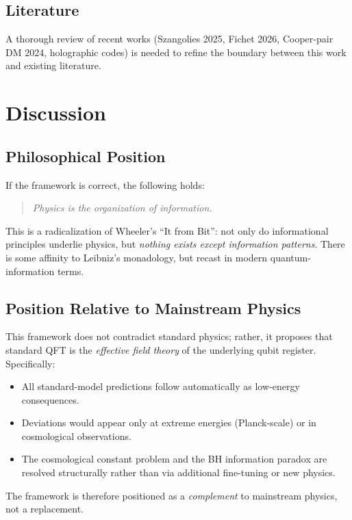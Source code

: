 \documentclass[11pt,a4paper]{article}
\begin{document}
\subsection{Literature}

A thorough review of recent works (Szangolies 2025, Fichet 2026, Cooper-pair DM 2024, holographic codes) is needed to refine the boundary between this work and existing literature.

\section{Discussion}

\subsection{Philosophical Position}

If the framework is correct, the following holds:
\begin{quote}
\textit{Physics is the organization of information.}
\end{quote}

This is a radicalization of Wheeler's ``It from Bit'': not only do informational principles underlie physics, but \emph{nothing exists except information patterns}. There is some affinity to Leibniz's monadology, but recast in modern quantum-information terms.

\subsection{Position Relative to Mainstream Physics}

This framework does not contradict standard physics; rather, it proposes that standard QFT is the \emph{effective field theory} of the underlying qubit register. Specifically:
\begin{itemize}[leftmargin=*]
\item All standard-model predictions follow automatically as low-energy consequences.
\item Deviations would appear only at extreme energies (Planck-scale) or in cosmological observations.
\item The cosmological constant problem and the BH information paradox are resolved structurally rather than via additional fine-tuning or new physics.
\end{itemize}

The framework is therefore positioned as a \emph{complement} to mainstream physics, not a replacement.
\end{document}
